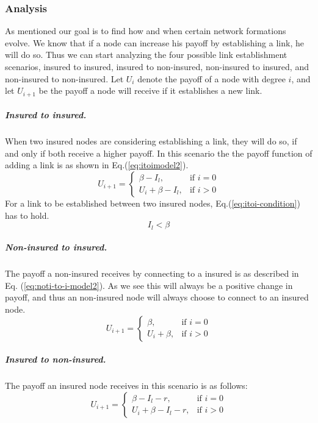 \subsubsection{Analysis}
As mentioned our goal is to find how and when certain network formations evolve. We know that if a node can increase his payoff by establishing a link, he will do so. Thus we can start analyzing the four possible link establishment scenarios, insured to insured, insured to non-insured, non-insured to insured, and non-insured to non-insured. 
Let $U_{i}$ denote the payoff of a node with degree $i$, and let $U_{i+1}$ be the payoff a node will receive if it establishes a new link.
\subparagraph{Insured to insured.}
When two insured nodes are considering establishing a link, they will do so, if and only if both receive a higher payoff.  In this scenario the the payoff function of adding a link is as shown in Eq.(\ref{eq:itoimodel2}).
\begin{equation}
    U_{i+1}= 
\begin{cases}
    \beta - I_{l},& \text{if } i = 0\\
    U_{i}+\beta -I_{l},& \text{if }  i>0
   
\end{cases}
\label{eq:itoimodel2}
\end{equation}
For a link to be established between two insured nodes, Eq.(\ref{eq:itoi-condition}) has to hold.
\begin{equation}
I_{l}<\beta
\label{eq:itoi-condition}
\end{equation}
\subparagraph{Non-insured to insured.}
The payoff a non-insured receives by connecting to a insured is as described in Eq. (\ref{eq:noti-to-i-model2}). As we see this will always be a positive change in payoff, and thus an non-insured node will always choose to connect to an insured node.
\begin{equation}
    U_{i+1}= 
\begin{cases}
    \beta,& \text{if } i = 0\\
    U_{i}+\beta,& \text{if }  i>0
   
\end{cases}
\label{eq:noti-to-i-model2}
\end{equation}
\subparagraph{Insured to non-insured.}
The payoff an insured node receives in this scenario is as follows:
\begin{equation}
    U_{i+1}= 
\begin{cases}
    \beta - I_{l}-r,& \text{if } i = 0\\
    U_{i}+\beta -I_{l}-r,& \text{if }  i>0
   
\end{cases}
\label{eq:itonotimodel2}
\end{equation}
